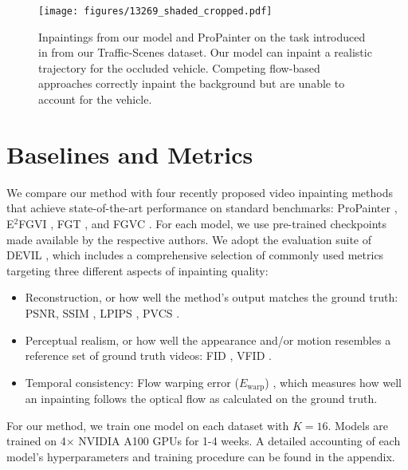 \begin{figure}
    \centering
    \texttt{[image: figures/13269\_shaded\_cropped.pdf]}
    \caption[Inpaintings from our model and ProPainter on the task introduced in  from our Traffic-Scenes dataset.]{Inpaintings from our model and ProPainter on the task introduced in  from our Traffic-Scenes dataset. Our model can inpaint a realistic trajectory for the occluded vehicle. Competing flow-based approaches correctly inpaint the background but are unable to account for the vehicle.}
    \label{fig:traffic-scenes}
\end{figure}
\section{Baselines and Metrics} 
We compare our method with four recently proposed video inpainting methods that achieve state-of-the-art performance on standard benchmarks: ProPainter \citep{propainter}, E$^2$FGVI \citep{endtoend}, FGT \citep{fgt}, and FGVC \citep{flowedgeguided}. For each model, we use pre-trained checkpoints made available by the respective authors. We adopt the evaluation suite of DEVIL \citep{devil}, which includes a comprehensive selection of commonly used metrics targeting three different aspects of inpainting quality:
\begin{itemize}
    \item Reconstruction, or how well the method's output matches the ground truth: PSNR, SSIM \citep{ssim}, LPIPS \citep{lpips}, PVCS \citep{devil}. 
    \item Perceptual realism, or how well the appearance and/or motion resembles a reference set of ground truth videos: FID \citep{fid}, VFID \citep{vfid}.
    \item Temporal consistency: Flow warping error ($E_\text{warp}$) \citep{ewarp}, which measures how well an inpainting follows the optical flow as calculated on the ground truth. 
\end{itemize} 
For our method, we train one model on each dataset with $K=16$. Models are trained on 4$\times$ NVIDIA A100 GPUs for 1-4 weeks. A detailed accounting of each model's hyperparameters and training procedure can be found in the appendix.

